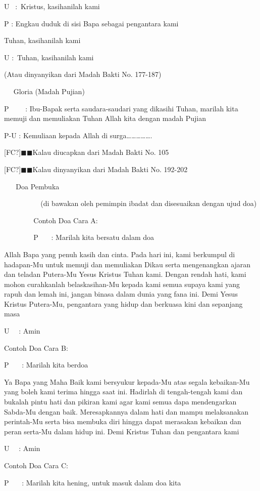 \documentclass{article}
\begin{document}
U~ :~Kristus, kasihanilah kami

P : Engkau duduk di sisi Bapa sebagai pengantara kami

Tuhan, kasihanilah kami

U :~Tuhan, kasihanilah kami

(Atau dinyanyikan dari Madah Bakti No. 177-187)

~ ~Gloria (Madah Pujian)

P~~~~ : Ibu-Bapak serta saudara-saudari yang dikasihi Tuhan, marilah kita memuji dan memuliakan Tuhan Allah kita dengan
madah Pujian

P-U : Kemuliaan kepada Allah di surga{\dots}{\dots}{\dots}{\dots}{\dots}.

[FC?]${\blacksquare}{\blacksquare}$Kalau diucapkan dari Madah Bakti No. 105

[FC?]${\blacksquare}{\blacksquare}$Kalau dinyanyikan dari Madah Bakti No. 192-202

~ ~ Doa Pembuka

~~~ ~ ~ ~ ~ (di bawakan oleh pemimpin ibadat dan disesuaikan dengan ujud doa)

~ ~ ~ ~ ~ Contoh Doa Cara A:

~ ~ ~ ~ ~ P~~~ : Marilah kita bersatu dalam doa

Allah Bapa yang penuh kasih dan cinta. Pada hari ini, kami berkumpul di hadapan-Mu untuk memuji dan memuliakan Dikau
serta mengenangkan ajaran dan teladan Putera-Mu Yesus Kristus Tuhan kami. Dengan rendah hati, kami mohon curahkanlah
belaskasihan-Mu kepada kami semua supaya kami yang rapuh dan lemah ini, jangan binasa dalam dunia yang fana ini. Demi
Yesus Kristus Putera-Mu, pengantara yang hidup dan berkuasa kini dan sepanjang masa

U~~ : Amin

Contoh Doa Cara B:

P~~~ : Marilah kita berdoa

Ya Bapa yang Maha Baik kami bersyukur kepada-Mu atas segala kebaikan-Mu yang boleh kami terima hingga saat ini. Hadirlah
di tengah-tengah kami dan bukalah pintu hati dan pikiran kami agar kami semua dapa mendengarkan Sabda-Mu dengan baik.
Meresapkannya dalam hati dan mampu melaksanakan perintah-Mu serta bisa membuka diri hingga dapat merasakan kebaikan dan
peran serta-Mu dalam hidup ini. Demi Kristus Tuhan dan pengantara kami

U~~ : Amin

Contoh Doa Cara C:

P~~~ : Marilah kita hening, untuk masuk dalam doa kita
\end{document}
